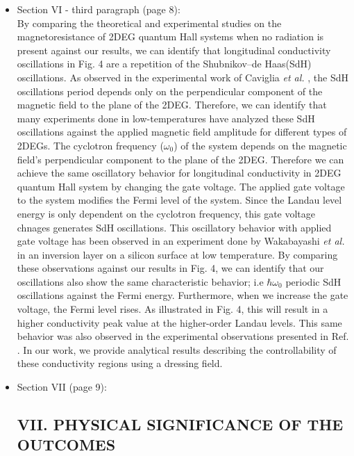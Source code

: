 \documentclass{article}
\begin{document}
\begin{itemize}
  \item Section VI - third paragraph (page 8):\\
  {\color{Red}
  By comparing the theoretical \cite{ando72,ando74_1,ando74_2,ando74_3,ando74_4,ando82,endo09} and experimental \cite{endo09,wakabayashi78,ochiai190,mancoff96,arapov02,grbic04,caviglia10} studies on the magnetoresistance of 2DEG quantum Hall systems when no radiation is present against our results, we can identify that longitudinal conductivity oscillations in Fig. 4 are a repetition of the Shubnikov–de Haas(SdH) oscillations.
  As observed in the experimental work of Caviglia \textit{et al.} \cite{caviglia10}, the SdH oscillations period depends only on the perpendicular component of the magnetic field to the plane of the 2DEG.
  Therefore, we can identify that many experiments done in low-temperatures \cite{endo09,ochiai190,mancoff96,arapov02,grbic04,caviglia10} have analyzed these SdH oscillations against the applied magnetic field amplitude for different types of 2DEGs.
  The cyclotron frequency ($\omega_0$) of the system depends on the magnetic field's perpendicular component to the plane of the 2DEG.
  Therefore we can achieve the same oscillatory behavior for longitudinal conductivity in 2DEG quantum Hall system by changing the gate voltage.
  The applied gate voltage to the system modifies the Fermi level of the system.
  Since the Landau level energy is only dependent on the cyclotron frequency, this gate voltage chnages generates SdH oscillations.
  This oscillatory behavior with applied gate voltage has been observed in an  experiment done by Wakabayashi \textit{et al.} \cite{wakabayashi78} in an inversion layer on a silicon surface at low temperature.
  By comparing these observations against our results in Fig. 4, we can identify that our oscillations also show the same characteristic behavior; i.e  $\hbar\omega_0$ periodic SdH oscillations against the Fermi energy.
  Furthermore, when we increase the gate voltage, the Fermi level rises. As illustrated in Fig. 4, this will result in a higher conductivity peak value at the higher-order Landau levels. This same behavior was also observed in the experimental observations presented in Ref. \cite{wakabayashi78}.
  In our work, we provide analytical results describing the controllability of these conductivity regions using a dressing field.
  }
  \item Section VII (page 9):\\
  {\color{Red}
  \subsection*{VII. PHYSICAL SIGNIFICANCE OF THE OUTCOMES}

}
\end{itemize}
\end{document}
